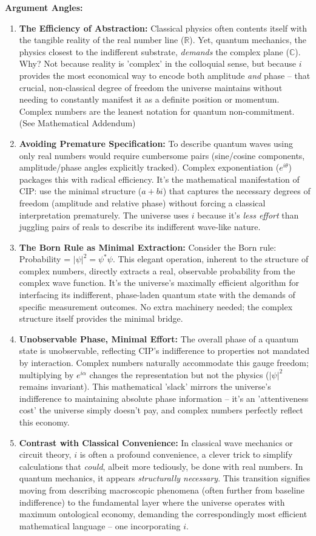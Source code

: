 \documentclass[11pt, a4paper]{article}
\begin{document}
\textbf{Argument Angles:}
\begin{enumerate}
    \item \textbf{The Efficiency of Abstraction:} Classical physics often contents itself with the tangible reality of the real number line ($\mathbb{R}$). Yet, quantum mechanics, the physics closest to the indifferent substrate, \textit{demands} the complex plane ($\mathbb{C}$). Why? Not because reality is 'complex' in the colloquial sense, but because $i$ provides the most economical way to encode both amplitude \textit{and} phase – that crucial, non-classical degree of freedom the universe maintains without needing to constantly manifest it as a definite position or momentum. Complex numbers are the leanest notation for quantum non-commitment. (See Mathematical Addendum)
    \item \textbf{Avoiding Premature Specification:} To describe quantum waves using only real numbers would require cumbersome pairs (sine/cosine components, amplitude/phase angles explicitly tracked). Complex exponentiation ($e^{i\theta}$) packages this with radical efficiency. It's the mathematical manifestation of CIP: use the minimal structure ($a + bi$) that captures the necessary degrees of freedom (amplitude and relative phase) without forcing a classical interpretation prematurely. The universe uses $i$ because it's \textit{less effort} than juggling pairs of reals to describe its indifferent wave-like nature.
    \item \textbf{The Born Rule as Minimal Extraction:} Consider the Born rule: Probability = $|\psi|^2 = \psi^*\psi$. This elegant operation, inherent to the structure of complex numbers, directly extracts a real, observable probability from the complex wave function. It's the universe's maximally efficient algorithm for interfacing its indifferent, phase-laden quantum state with the demands of specific measurement outcomes. No extra machinery needed; the complex structure itself provides the minimal bridge.
    \item \textbf{Unobservable Phase, Minimal Effort:} The overall phase of a quantum state is unobservable, reflecting CIP's indifference to properties not mandated by interaction. Complex numbers naturally accommodate this gauge freedom; multiplying by $e^{i\alpha}$ changes the representation but not the physics ($|\psi|^2$ remains invariant). This mathematical 'slack' mirrors the universe's indifference to maintaining absolute phase information – it's an 'attentiveness cost' the universe simply doesn't pay, and complex numbers perfectly reflect this economy.
    \item \textbf{Contrast with Classical Convenience:} In classical wave mechanics or circuit theory, $i$ is often a profound convenience, a clever trick to simplify calculations that \textit{could}, albeit more tediously, be done with real numbers. In quantum mechanics, it appears \textit{structurally necessary}. This transition signifies moving from describing macroscopic phenomena (often further from baseline indifference) to the fundamental layer where the universe operates with maximum ontological economy, demanding the correspondingly most efficient mathematical language – one incorporating $i$.
\end{enumerate}
\end{document}
